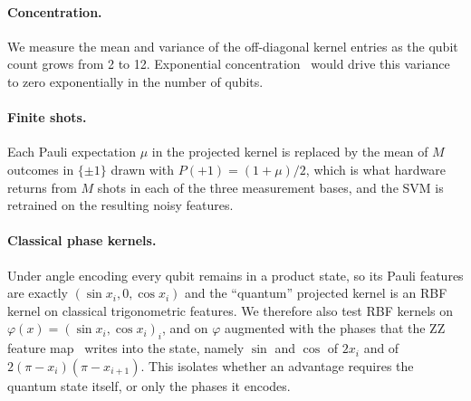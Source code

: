 \paragraph{Concentration.} We measure the mean and variance of the off-diagonal kernel entries as the
qubit count grows from 2 to 12. Exponential concentration~\cite{thanasilp2024concentration} would drive
this variance to zero exponentially in the number of qubits.

\paragraph{Finite shots.} Each Pauli expectation $\mu$ in the projected kernel is replaced by the mean of
$M$ outcomes in $\{\pm1\}$ drawn with $P(+1)=(1+\mu)/2$, which is what hardware returns from $M$ shots in
each of the three measurement bases, and the SVM is retrained on the resulting noisy features.

\paragraph{Classical phase kernels.} Under angle encoding every qubit remains in a product state, so its
Pauli features are exactly $(\sin x_i, 0, \cos x_i)$ and the ``quantum'' projected kernel is an RBF kernel
on classical trigonometric features. We therefore also test RBF kernels on
$\varphi(x)=(\sin x_i,\cos x_i)_{i}$, and on $\varphi$ augmented with the phases that the ZZ feature
map~\cite{havlicek2019supervised} writes into the state, namely $\sin$ and $\cos$ of $2x_i$ and of
$2(\pi-x_i)(\pi-x_{i+1})$. This isolates whether an advantage requires the quantum state itself, or only
the phases it encodes.
